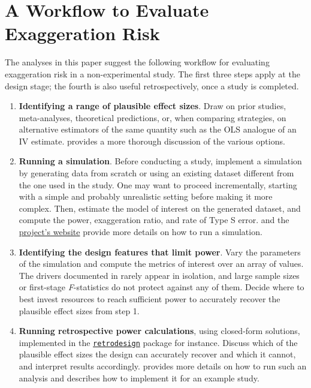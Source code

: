 \documentclass[12pt]{article}
\begin{document}
            \section{A Workflow to Evaluate Exaggeration Risk}\label{workflow}
            
            	The analyses in this paper suggest the following workflow for evaluating exaggeration risk in a non-experimental study. The first three steps apply at the design stage; the fourth is also useful retrospectively, once a study is completed.
	
		\begin{enumerate}
			\item \textbf{Identifying a range of plausible effect sizes}. Draw on prior studies, meta-analyses, theoretical predictions, or, when comparing strategies, on alternative estimators of the same quantity such as the OLS analogue of an IV estimate.  provides a more thorough discussion of the various options.
			\item \textbf{Running a simulation}. Before conducting a study, implement a simulation by generating data from scratch or using an existing dataset different from the one used in the study. One may want to proceed incrementally, starting with a simple and probably unrealistic setting before making it more complex. Then, estimate the model of interest on the generated dataset, and compute the power, exaggeration ratio, and rate of Type S error.  and the  \href{https://vincentbagilet.github.io/inference_pollution/power_sim.html}{project's website} provide more details on how to run a simulation.
			\item \textbf{Identifying the design features that limit power}. Vary the parameters of the simulation and compute the metrics of interest over an array of values. The drivers documented in  rarely appear in isolation, and large sample sizes or first-stage \textit{F}-statistics do not protect against any of them. Decide where to best invest resources to reach sufficient power to accurately recover the plausible effect sizes from step 1.
			\item \textbf{Running retrospective power calculations}, using closed-form solutions, implemented in the \href{https://github.com/andytimm/retrodesign}{\texttt{retrodesign}} package for instance. Discuss which of the plausible effect sizes the design can accurately recover and which it cannot, and interpret results accordingly.  provides more details on how to run such an analysis and  describes how to implement it for an example study.
		\end{enumerate}
            
                    
\end{document}
